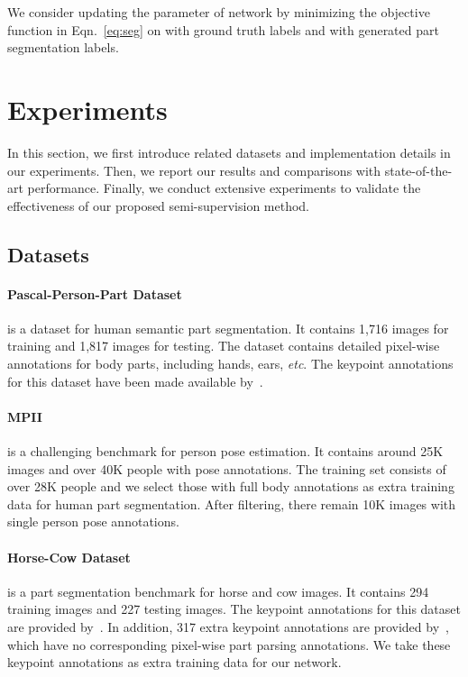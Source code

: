 \documentclass[10pt,twocolumn,letterpaper]{article}
\begin{document}
We consider updating the parameter  of network  by minimizing the objective function in Eqn.~\ref{eq:seg} on  with ground truth labels and  with generated part segmentation labels.
\vspace{-2mm}
\section{Experiments}
\vspace{-2mm}
In this section, we first introduce related datasets and implementation details in our experiments. Then, we report our results and comparisons with state-of-the-art performance. Finally, we conduct extensive experiments to validate the effectiveness of our proposed semi-supervision method.
\subsection{Datasets}
\paragraph{Pascal-Person-Part Dataset~\cite{chen2014detect}} is a dataset for human semantic part segmentation. It contains 1,716 images for training and 1,817 images for testing. The dataset contains detailed pixel-wise annotations for body parts, including hands, ears, \emph{etc}. The keypoint annotations for this dataset have been made available by~\cite{xia2017joint}.
\vspace{-3mm}
\paragraph{MPII~\cite{andriluka14cvpr}} is a challenging benchmark for person pose estimation. It contains around 25K images and over 40K people with pose annotations. The training set consists of over 28K people and we select those with full body annotations as extra training data for human part segmentation. After filtering, there remain 10K images with single person pose annotations.
\vspace{-3mm}
\paragraph{Horse-Cow Dataset~\cite{wang2015semantic}} is a part segmentation benchmark for horse and cow images. It contains 294 training images and 227 testing images. The keypoint annotations for this dataset are provided by~\cite{PoseletsPAMI}. In addition, 317 extra keypoint annotations are provided by~\cite{PoseletsPAMI}, which have no corresponding pixel-wise part parsing annotations. We take these keypoint annotations as extra training data for our network.
\end{document}

